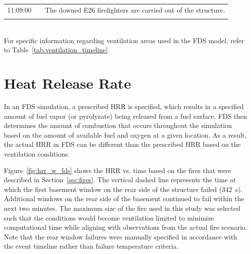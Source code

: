 \documentclass[12pt,oneside]{book}
\begin{document}
\begin{table}[!ht]
\begin{tabular}{ccl}
11:09:00       &              &  The downed E26 firefighters are carried out of the structure.       \\
               &              &                                                                      \\
\bottomrule
\end{tabular}
\footnotesize
\\ For specific information regarding ventilation areas used in the FDS model, refer to Table~\ref{tab:ventilation_timeline}.
\normalsize
\label{tab:combined_timeline}
\end{table}


\clearpage


\section{Heat Release Rate}
\label{sec:HRR}

In an FDS simulation, a prescribed HRR is specified, which results in a specified amount of fuel vapor (or pyrolyzate) being released from a fuel surface. FDS then determines the amount of combustion that occurs throughout the simulation based on the amount of available fuel and oxygen at a given location. As a result, the actual HRR in FDS can be different than the prescribed HRR based on the ventilation conditions.

Figure~\ref{fig:hrr_w_fds} shows the HRR vs. time based on the fires that were described in Section~\ref{sec:fires}. The vertical dashed line represents the time at which the first basement window on the rear side of the structure failed (342~s). Additional windows on the rear side of the basement continued to fail within the next two minutes. The maximum size of the fire used in this study was selected such that the conditions would become ventilation limited to minimize computational time while aligning with observations from the actual fire scenario. Note that the rear window failures were manually specified in accordance with the event timeline rather than failure temperature criteria.
\end{document}

